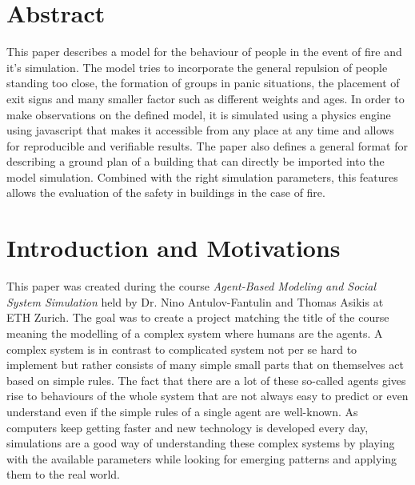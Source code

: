 \documentclass[11pt]{article}
\begin{document}






\tableofcontents

\newpage




\section{Abstract}

This paper describes a model for the behaviour of people in the event of fire and it's simulation. The model tries to incorporate the general repulsion of people standing too close, the formation of groups in panic situations, the placement of exit signs and many smaller factor such as different weights and ages. In order to make observations on the defined model, it is simulated using a physics engine using javascript that makes it accessible from any place at any time and allows for reproducible and verifiable results. The paper also defines a general format for describing a ground plan of a building that can directly be imported into the model simulation. Combined with the right simulation parameters, this features allows the evaluation of the safety in buildings in the case of fire.

\section{Introduction and Motivations}

This paper was created during the course \textit{Agent-Based Modeling and Social System Simulation} held by Dr. Nino Antulov-Fantulin and Thomas Asikis at ETH Zurich. The goal was to create a project matching the title of the course meaning the modelling of a complex system where humans are the agents. A complex system is in contrast to complicated system not per se hard to implement but rather consists of many simple small parts that on themselves act based on simple rules. The fact that there are a lot of these so-called agents gives rise to behaviours of the whole system that are not always easy to predict or even understand even if the simple rules of a single agent are well-known. As computers keep getting faster and new technology is developed every day, simulations are a good way of understanding these complex systems by playing with the available parameters while looking for emerging patterns and applying them to the real world.
\end{document}
